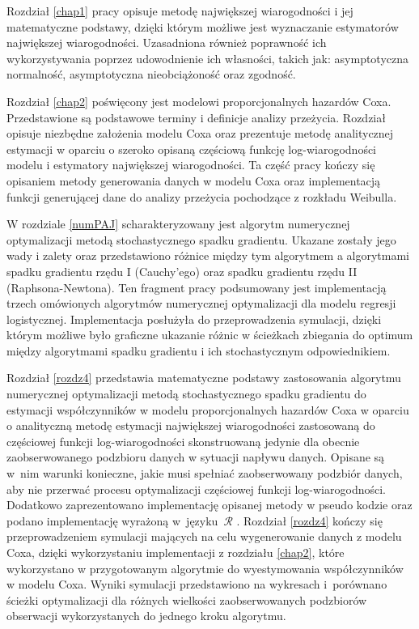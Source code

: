 Rozdział \ref{chap1} pracy opisuje metodę największej wiarogodności i jej matematyczne podstawy, dzięki którym możliwe jest wyznaczanie estymatorów największej wiarogodności. Uzasadniona również poprawność ich wykorzystywania poprzez udowodnienie ich własności, takich jak: asymptotyczna normalność, asymptotyczna nieobciążoność oraz zgodność. 

Rozdział \ref{chap2} poświęcony jest modelowi proporcjonalnych hazardów Coxa. Przedstawione są podstawowe terminy i definicje analizy przeżycia. Rozdział opisuje niezbędne założenia modelu Coxa oraz prezentuje metodę analitycznej estymacji w oparciu o szeroko opisaną częściową funkcję log-wiarogodności modelu i estymatory największej wiarogodności. Ta część pracy kończy się opisaniem metody generowania danych w modelu Coxa oraz implementacją funkcji generującej dane do analizy przeżycia pochodzące z rozkładu Weibulla. 

W rozdziale \ref{numPAJ} scharakteryzowany jest algorytm numerycznej optymalizacji metodą stochastycznego spadku gradientu. Ukazane zostały jego wady i zalety oraz przedstawiono różnice między tym algorytmem a algorytmami spadku gradientu rzędu I (Cauchy'ego) oraz spadku gradientu rzędu II (Raphsona-Newtona). Ten fragment pracy podsumowany jest implementacją trzech omówionych algorytmów numerycznej optymalizacji dla modelu regresji logistycznej. Implementacja posłużyła do przeprowadzenia symulacji, dzięki którym możliwe było graficzne ukazanie różnic w ścieżkach zbiegania do optimum między algorytmami spadku gradientu i ich stochastycznym odpowiednikiem. 

Rozdział \ref{rozdz4} przedstawia matematyczne podstawy zastosowania algorytmu numerycznej optymalizacji metodą stochastycznego spadku gradientu do estymacji współczynników w modelu proporcjonalnych hazardów Coxa w oparciu o analityczną metodę estymacji największej wiarogodności zastosowaną do częściowej funkcji log-wiarogodności skonstruowaną jedynie dla obecnie zaobserwowanego podzbioru danych w sytuacji napływu danych. Opisane są w~nim warunki konieczne, jakie musi spełniać zaobserwowany podzbiór danych, aby nie przerwać procesu optymalizacji częściowej funkcji log-wiarogodności. Dodatkowo zaprezentowano implementację opisanej metody w pseudo kodzie oraz podano implementację wyrażoną w~języku~$\mathcal{R}$ \citep{programikr, biecek1}. Rozdział \ref{rozdz4} kończy się przeprowadzeniem symulacji mających na celu wygenerowanie danych z modelu Coxa, dzięki wykorzystaniu implementacji z rozdziału \ref{chap2}, które wykorzystano w przygotowanym algorytmie do wyestymowania współczynników w modelu Coxa. Wyniki symulacji przedstawiono na wykresach i~porównano ścieżki optymalizacji dla różnych wielkości zaobserwowanych podzbiorów obserwacji wykorzystanych do jednego kroku algorytmu. 

